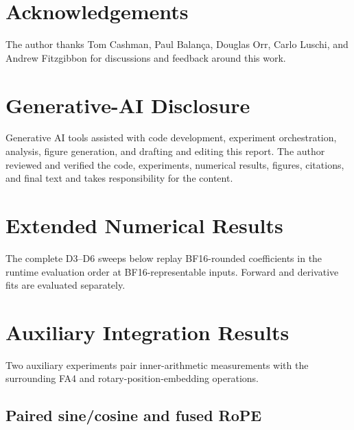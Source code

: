 \documentclass[11pt]{article}
\begin{document}
\section*{Acknowledgements}

The author thanks Tom Cashman, Paul Balança, Douglas Orr, Carlo Luschi, and
Andrew Fitzgibbon for discussions and feedback around this work.

\section*{Generative-AI Disclosure}

Generative AI tools assisted with code development, experiment orchestration,
analysis, figure generation, and drafting and editing this report. The author
reviewed and verified the code, experiments, numerical results, figures,
citations, and final text and takes responsibility for the content.

\begingroup
\scriptsize


\endgroup

\clearpage
\appendix

\section{Extended Numerical Results}
\label{app:extended-numerics}

The complete D3--D6 sweeps below replay BF16-rounded coefficients in the
runtime evaluation order at BF16-representable inputs. Forward and derivative
fits are evaluated separately.



\FloatBarrier

\section{Auxiliary Integration Results}
\label{app:negative-results}

Two auxiliary experiments pair inner-arithmetic measurements with the
surrounding FA4 and rotary-position-embedding operations.



\subsection{Paired sine/cosine and fused RoPE}
\label{app:rope-negative}



\end{document}
